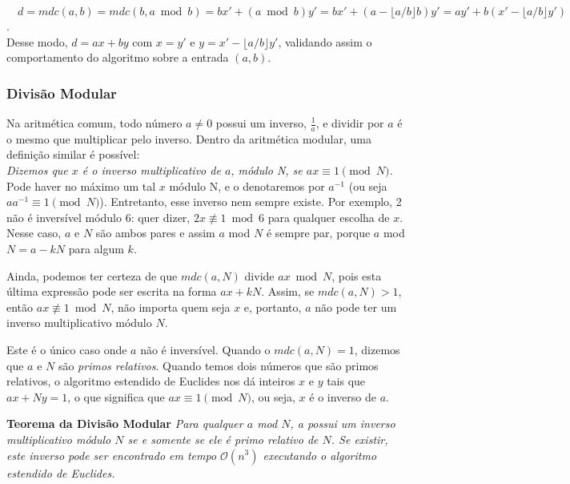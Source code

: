 $\quad d = mdc(a,b) = mdc(b, a\bmod b) = bx' + (a \bmod b)y' = bx' + (a -
\lfloor a/b \rfloor b)y' = ay' + b(x' - \lfloor a/b \rfloor y')$.\\

Desse modo, $d = ax + by$ com $x = y'$ e $y = x' - \lfloor a/b \rfloor y'$,
validando assim o comportamento do algoritmo sobre a entrada $(a,b)$.


\vspace{1.3em}
\subsubsection*{Divisão Modular}

Na aritmética comum, todo número $a \neq 0$ possui um inverso, $\frac{1}{a}$,
e dividir por $a$ é o mesmo que multiplicar pelo inverso. Dentro da aritmética
modular, uma definição similar é possível:\\

\textit{Dizemos que $x$ é o inverso multiplicativo de $a$, módulo N, se $ax
\equiv 1 \pmod N$.}\\

Pode haver no máximo um tal $x$ módulo N, e o denotaremos por $a^{-1}$ (ou
seja $aa^{-1} \equiv 1 \pmod N$).
Entretanto, esse inverso nem sempre existe. Por exemplo, 2 não é inversível
módulo 6: quer dizer, $2x \not\equiv 1 \bmod 6$ para qualquer escolha de $x$.
Nesse caso, $a$ e $N$ são ambos pares e assim $a$ mod $N$ é sempre par, porque
$a$ mod $N = a - kN$ para algum $k$.

Ainda, podemos ter certeza de que $mdc(a,N)$ divide $ax \bmod N$, pois esta
última expressão pode ser escrita na forma $ax + kN$. Assim, se $mdc(a,N) >
1$, então $ax \not\equiv 1 \bmod N$, não importa quem seja $x$ e, portanto,
$a$ não pode ter um inverso multiplicativo módulo $N$.

Este é o único caso onde $a$ não é inversível. Quando o $mdc(a,N) = 1$,
dizemos que $a$ e $N$ são \textit{primos relativos}. Quando temos dois números
que são primos relativos, o algoritmo estendido de Euclides nos dá inteiros
$x$ e $y$ tais que $ax + Ny = 1$, o que significa que $ax \equiv 1 \pmod N$,
ou seja, $x$ é o inverso de $a$.

\textbf{Teorema da Divisão Modular} \textit{Para qualquer $a$ mod $N$, a
possui um inverso multiplicativo módulo $N$ se e somente se ele é primo
relativo de $N$. Se existir, este inverso pode ser encontrado em tempo
$\mathcal{O}(n^3)$ executando o algoritmo estendido de Euclides.}

